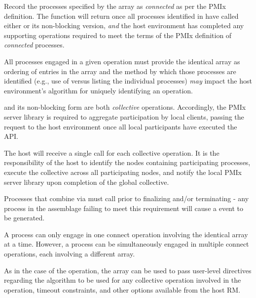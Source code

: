 \descr

Record the processes specified by the  array as \textit{connected} as per the \ac{PMIx} definition. The function will return once all processes identified in  have called either  or its non-blocking version, \textit{and} the host environment has completed any supporting operations required to meet the terms of the \ac{PMIx} definition of \textit{connected} processes.

\adviceuserstart
All processes engaged in a given  operation must provide the identical  array as ordering of entries in the array and the method by which those processes are identified (e.g., use of  versus listing the individual processes) \textit{may} impact the host environment's algorithm for uniquely identifying an operation.
\adviceuserend

\adviceimplstart
{} and its non-blocking form are both \emph{collective} operations. Accordingly, the \ac{PMIx} server library is required to aggregate participation by local clients, passing the request to the host environment once all local participants have executed the \ac{API}.
\adviceimplend

\advicermstart
The host will receive a single call for each collective operation. It is the responsibility of the host to identify the nodes containing participating processes, execute the collective across all participating nodes, and notify the local \ac{PMIx} server library upon completion of the global collective.
\advicermend

Processes that combine via  must call  prior to finalizing and/or terminating - any process in the assemblage failing to meet this requirement will cause a  event to be generated.

A process can only engage in one connect operation involving the identical  array at a time.
However, a process can be simultaneously engaged in multiple connect operations, each involving a different  array.

As in the case of the  operation, the  array can be used to pass user-level directives regarding the algorithm to be used for any collective operation involved in the operation, timeout constraints, and other options available from the host \ac{RM}.


